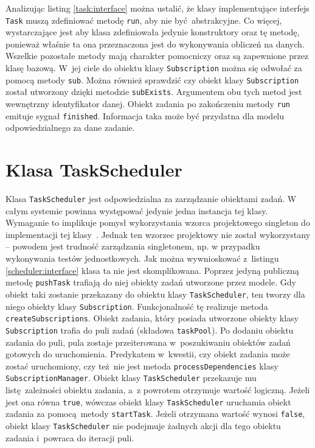Analizując listing \ref{task:interface} można ustalić, że klasy implementujące interfejs \lstinline$Task$ muszą zdefiniować metodę \lstinline$run$, aby nie być abstrakcyjne. Co więcej, wystarczające jest aby klasa zdefiniowała jedynie konstruktory oraz tę metodę, ponieważ właśnie ta ona przeznaczona jest do wykonywania obliczeń na danych. Wszelkie pozostałe metody mają charakter pomocniczy oraz są zapewnione przez klasę bazową. W~jej ciele do obiektu klasy \lstinline$Subscription$ można się odwołać za pomocą metody \lstinline$sub$. Można również sprawdzić czy obiekt klasy \lstinline$Subscription$ został utworzony dzięki metodzie \lstinline$subExists$. Argumentem obu tych metod jest wewnętrzny identyfikator danej. Obiekt zadania po zakończeniu metody \lstinline$run$ emituje sygnał \lstinline$finished$. Informacja taka może być przydatna dla modelu odpowiedzialnego za dane zadanie.

\section{Klasa TaskScheduler} 
Klasa \lstinline$TaskScheduler$ jest odpowiedzialna za zarządzanie obiektami zadań. W całym systemie powinna występować jedynie jedna instancja tej klasy. Wymaganie to implikuje pomysł wykorzystania wzorca projektowego singleton do implementacji tej klasy~\cite{singleton}. Jednak ten wzorzec projektowy nie został wykorzystany -- powodem jest trudność zarządzania singletonem, np. w przypadku wykonywania testów jednostkowych. Jak można wywnioskować z~listingu \ref{scheduler:interface} klasa ta nie jest skomplikowana. Poprzez jedyną publiczną metodę \lstinline$pushTask$ trafiają do niej obiekty zadań utworzone przez modele. Gdy obiekt taki zostanie przekazany do obiektu klasy \lstinline$TaskScheduler$, ten tworzy dla niego obiekty klasy \lstinline$Subscription$. Funkcjonalność tę realizuje metoda \lstinline$createSubscriptions$. Obiekt zadania, który posiada utworzone obiekty klasy \lstinline$Subscription$ trafia do puli zadań (składowa \lstinline$taskPool$). Po dodaniu obiektu zadania do puli, pula zostaje przeiterowana w~poszukiwaniu obiektów zadań gotowych do uruchomienia. Predykatem w~kwestii, czy obiekt zadania może zostać uruchomiony, czy też nie jest metoda \lstinline$processDependencies$ klasy \lstinline$SubscriptionManager$. Obiekt klasy \lstinline$TaskScheduler$ przekazuje mu listę zależności obiektu zadania, a~z powrotem otrzymuje wartość logiczną. Jeżeli jest ona równa \lstinline$true$, wówczas obiekt klasy \lstinline$TaskScheduler$ uruchamia obiekt zadania za pomocą metody \lstinline$startTask$. Jeżeli otrzymana wartość wynosi \lstinline$false$, obiekt klasy \lstinline$TaskScheduler$ nie podejmuje żadnych akcji dla tego obiektu zadania i~powraca do iteracji puli.

